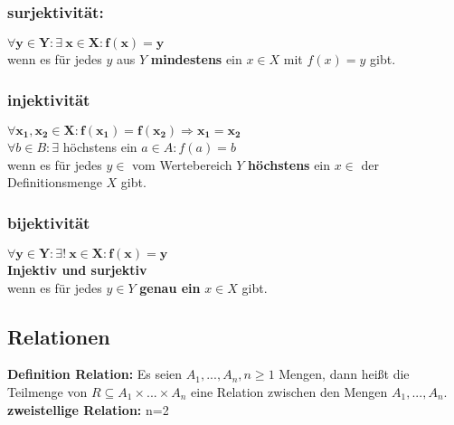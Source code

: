 
\subsubsection{surjektivität:}\label{subs:surjektivitaet}
$\bm{\forall y \in Y : \exists \  x \in X:f(x)=y}$\\
wenn es für jedes $y$ aus $Y$ \textbf{mindestens} ein $x \in X$ mit $f(x) = y$ gibt.\\

\subsubsection{injektivität}\label{subs:injektivitaet}
$\bm{\forall x_1,x_2 \in X:f(x_1)=f(x_2) \Rightarrow x_1=x_2}$\\
$\forall b \in B: \exists$ höchstens ein $a \in A :f(a)=b$\\
wenn es für jedes $y \in $ vom Wertebereich $Y$ \textbf{höchstens} ein $x \in$ der Definitionsmenge $X$ gibt.\\

\subsubsection{bijektivität}\label{subs:bijektivitaet}  
$\bm{\forall y \in Y : \exists ! \  x \in X:f(x)=y}$\\
\textbf{Injektiv und surjektiv}\\
wenn es für jedes $y\in Y$  \textbf{genau ein} $x \in X$ gibt.\\

\subsection{Relationen}
\textbf{Definition Relation:} Es seien $A_1, ..., A_n, n\geq 1$ Mengen, dann heißt die Teilmenge von $R \subseteq A_1 \times ... \times A_n$ eine Relation zwischen den Mengen $A_1,...,A_n$.\\
\textbf{zweistellige Relation:} n=2\\

